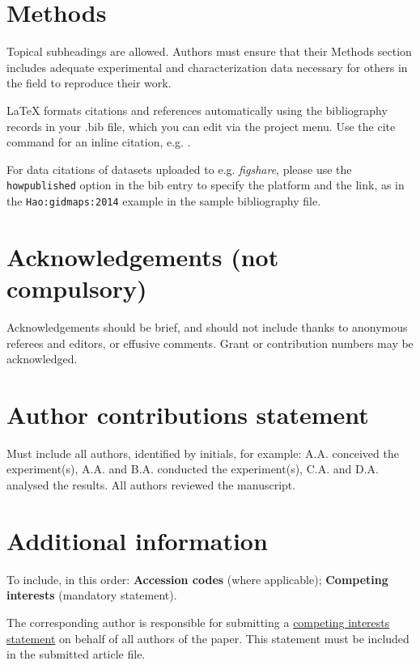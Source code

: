 \documentclass[fleqn,10pt]{wlscirep}
\begin{document}
\section*{Methods}

Topical subheadings are allowed. Authors must ensure that their Methods section includes adequate experimental and characterization data necessary for others in the field to reproduce their work.



\noindent LaTeX formats citations and references automatically using the bibliography records in your .bib file, which you can edit via the project menu. Use the cite command for an inline citation, e.g.  \cite{Hao:gidmaps:2014}.

For data citations of datasets uploaded to e.g. \emph{figshare}, please use the \verb|howpublished| option in the bib entry to specify the platform and the link, as in the \verb|Hao:gidmaps:2014| example in the sample bibliography file.

\section*{Acknowledgements (not compulsory)}

Acknowledgements should be brief, and should not include thanks to anonymous referees and editors, or effusive comments. Grant or contribution numbers may be acknowledged.

\section*{Author contributions statement}

Must include all authors, identified by initials, for example:
A.A. conceived the experiment(s),  A.A. and B.A. conducted the experiment(s), C.A. and D.A. analysed the results.  All authors reviewed the manuscript. 

\section*{Additional information}

To include, in this order: \textbf{Accession codes} (where applicable); \textbf{Competing interests} (mandatory statement). 

The corresponding author is responsible for submitting a \href{http://www.nature.com/srep/policies/index.html#competing}{competing interests statement} on behalf of all authors of the paper. This statement must be included in the submitted article file.
\end{document}
